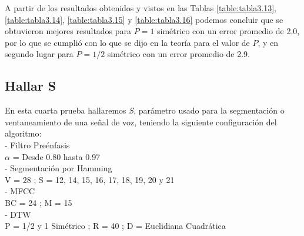 A partir de los resultados obtenidos y vistos en las Tablas \ref{table:tabla3.13}, \ref{table:tabla3.14}, \ref{table:tabla3.15} y \ref{table:tabla3.16} podemos concluir que se obtuvieron mejores resultados para $P = 1$ simétrico con un error promedio de 2.0, por lo que se cumplió con lo que se dijo en la teoría para el valor de $P$, y en segundo lugar para $P = 1/2$ simétrico con un error promedio de 2.9.

\subsection{Hallar S}
En esta cuarta prueba hallaremos \textit{S}, parámetro usado para la segmentación o ventaneamiento de una señal de voz, teniendo la siguiente configuración del algoritmo: \\
- Filtro Preénfasis \\
\hspace*{1cm} $\alpha$ = Desde 0.80 hasta 0.97 \\
- Segmentación por Hamming \\
\hspace*{1cm} V = 28 ; \qquad S = 12, 14, 15, 16, 17, 18, 19, 20 y 21 \\
- MFCC \\
\hspace*{1cm} BC = 24 ; \qquad M = 15 \\
- DTW \\
\hspace*{1cm} P = 1/2 y 1 Simétrico ; \qquad R = 40 ; \qquad D = Euclidiana Cuadrática
\vskip -1.0cm
